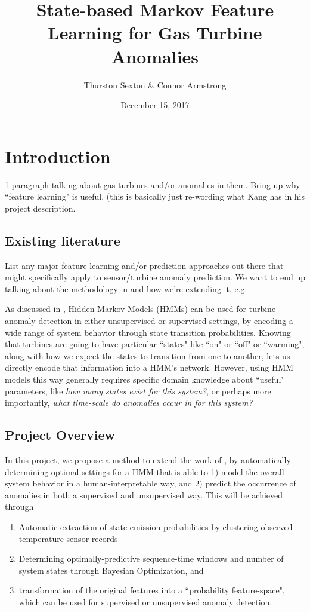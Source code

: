 \documentclass[twocolumn,10pt]{article}
\title{State-based Markov Feature Learning for Gas Turbine Anomalies}
\author{Thurston Sexton \& Connor Armstrong}
\date{December 15, 2017}
\begin{document}
\maketitle

\section{Introduction}
1 paragraph talking about gas turbines and/or anomalies in them. Bring up why ``feature learning" is useful. (this is basically just re-wording what Kang has in his project description. 

\subsection{Existing literature}
List any major feature learning and/or prediction approaches out there that might specifically apply to sensor/turbine anomaly prediction. We want to end up talking about the methodology in \citep{gas_turbine} and how we're extending it. e.g: 

As discussed in \citet{gas_turbine}, Hidden Markov Models (HMMs) can be used for turbine anomaly detection in either unsupervised or supervised settings, by encoding a wide range of system behavior through state transition probabilities. Knowing that turbines are going to have particular ``states" like ``on" or ``off" or ``warming", along with how we expect the states to transition from one to another, lets us directly encode that information into a HMM's network. However, using HMM models this way generally requires specific domain knowledge about ``useful" parameters, like \textit{how many states exist for this system?}, or perhaps more importantly, \textit{what time-scale do anomalies occur in for this system?}

\subsection{Project Overview}
In this project, we propose a method to extend the work of \citet{gas_turbine}, by automatically determining optimal settings for a HMM that is able to 1) model the overall system behavior in a human-interpretable way, and 2) predict the occurrence of anomalies in both a supervised and unsupervised way. 
This will be achieved through 
\begin{enumerate}
    \item Automatic extraction of state emission probabilities by clustering observed temperature sensor records
    \item Determining optimally-predictive sequence-time windows and number of system states through Bayesian Optimization, and
    \item transformation of the original features into a ``probability feature-space", which can be used for supervised or unsupervised anomaly detection. 
\end{enumerate}
\end{document}
